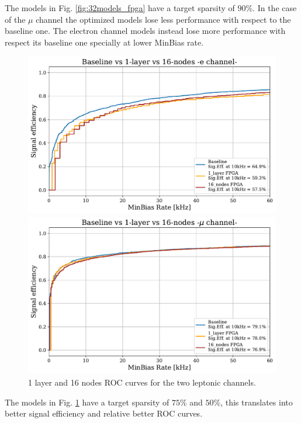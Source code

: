 \documentclass[../../main.tex]{subfiles}
\begin{document}
The models in Fig. \ref{fig:32models_fpga} have a target sparsity of $90\%$. In the case of the $\mu$ channel the optimized models lose less performance with respect to the baseline one. The electron channel models instead lose more performance with respect its baseline one specially at lower MinBias rate.  

\clearpage

\begin{figure}[h] 
  \label{ fig7} 
  \begin{minipage}[b]{0.5\linewidth}
    \centering
    \includegraphics[width=.9\linewidth]{sections/05/Images/Results_116_1eleFPGA.pdf} 
    \vspace{4ex}
  \end{minipage}%
  \begin{minipage}[b]{0.5\linewidth}
    \centering
    \includegraphics[width=.9\linewidth]{sections/05/Images/Results_116_1muFPGA.pdf}
    \vspace{4ex}
  \end{minipage} 
  \caption{1 layer and 16 nodes ROC curves for the two leptonic channels.}
  \label{fig:116models_fpga}
\end{figure}
The models in Fig. \ref{fig:116models_fpga} have a target sparsity of $75\%$ and $50\%$, this translates into better signal efficiency and relative better ROC curves.  
\end{document}
